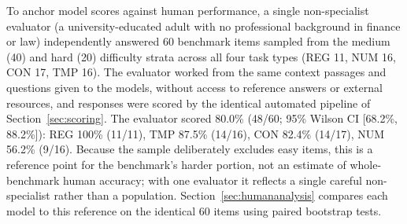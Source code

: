 To anchor model scores against human performance, a single non-specialist evaluator (a university-educated adult with no professional background in finance or law) independently answered 60 benchmark items sampled from the medium (40) and hard (20) difficulty strata across all four task types (REG 11, NUM 16, CON 17, TMP 16). The evaluator worked from the same context passages and questions given to the models, without access to reference answers or external resources, and responses were scored by the identical automated pipeline of Section~\ref{sec:scoring}. The evaluator scored 80.0\% (48/60; 95\% Wilson CI [68.2\%, 88.2\%]): REG 100\% (11/11), TMP 87.5\% (14/16), CON 82.4\% (14/17), NUM 56.2\% (9/16). Because the sample deliberately excludes easy items, this is a reference point for the benchmark's harder portion, not an estimate of whole-benchmark human accuracy; with one evaluator it reflects a single careful non-specialist rather than a population. Section~\ref{sec:humananalysis} compares each model to this reference on the identical 60 items using paired bootstrap tests.


